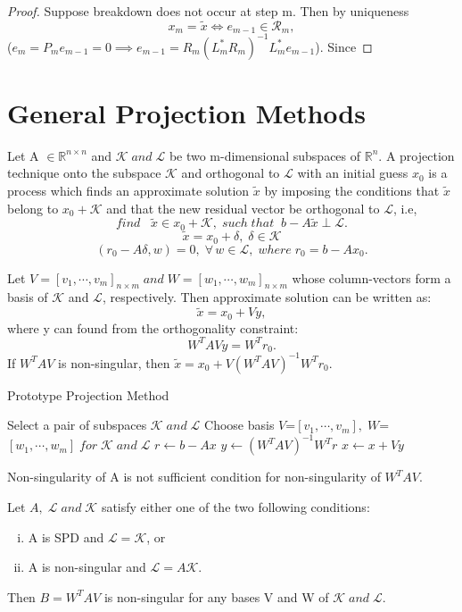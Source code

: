 \documentclass[10pt,a4paper]{article}
\begin{document}
\begin{proof}
Suppose breakdown does not occur at step m. Then by uniqueness $$x_m=\tilde{x}\Leftrightarrow e_{m-1}\in\mathcal{R}_m,$$ 
($e_m=P_me_{m-1}=0\implies e_{m-1}=R_m(L^*_mR_m)^{-1}L^*_me_{m-1}$). Since 
\end{proof}

\newpage

\section{General Projection Methods}

Let A $\in\mathbb{R}^{n\times n}$ and $\mathcal{K}\;and\;\mathcal{L}$ be two m-dimensional subspaces of $\mathbb{R}^n$. A projection technique onto the subspace $\mathcal{K}$ and orthogonal to $\mathcal{L}$ with an initial guess $x_0$ is a process which finds an approximate solution $\tilde{x}$ by imposing the conditions that $\tilde{x}$ belong to $x_0+\mathcal{K}$ and that the new residual vector be orthogonal to $\mathcal{L}$, i.e, $$find\;\;\;\tilde{x}\in x_0+\mathcal{K},\;such\;that\;\;b-A\tilde{x}\perp \mathcal{L}.$$
$$\tilde{x}=x_0+\delta,\;\delta\in\mathcal{K}$$
$$(r_0-A\delta,w)=0,\;\forall\,w\in\mathcal{L},\;where\;r_0=b-Ax_0.$$

Let $V=[v_1,\cdots,v_m]_{n\times m}\;and\;W=[w_1,\cdots,w_m]_{n\times m}$ whose column-vectors form a basis of $\mathcal{K}$ and $\mathcal{L}$, respectively.
Then approximate solution can be written as:
$$\tilde{x}=x_0+Vy,$$
where y can found from the orthogonality constraint:
$$W^TAVy=W^Tr_0.$$
If $W^TAV$ is non-singular, then $\tilde{x}=x_0+V(W^TAV)^{-1}W^Tr_0.$

\begin{algorithm}
\caption{Prototype Projection Method}
\begin{algorithmic}[1]
\Repeat
	\State Select a pair of subspaces $\mathcal{K}\;and\;\mathcal{L}$
	\State Choose basis $V$=$[v_1,\cdots,v_m],\;W$=$[w_1,\cdots,w_m]\;for\;\mathcal{K}\;and\;\mathcal{L}$
	\State $r\gets b-Ax$
	\State $y\gets (W^TAV)^{-1}W^Tr$
	\State $x\gets x+Vy$
\end{algorithmic}
\end{algorithm}

Non-singularity of A is not sufficient condition for non-singularity of $W^TAV$.

\begin{prop}
Let $A,\;\mathcal{L}\;and\;\mathcal{K}$ satisfy either one of the two following conditions:
\begin{enumerate}[i.]
\item A is SPD and $\mathcal{L}=\mathcal{K}$, or
\item A is non-singular and $\mathcal{L}=A\mathcal{K}$.
\end{enumerate}
Then $B=W^TAV$ is non-singular for any bases V and W of $\mathcal{K}\;and\;\mathcal{L}$.
\end{prop}
\end{document}
